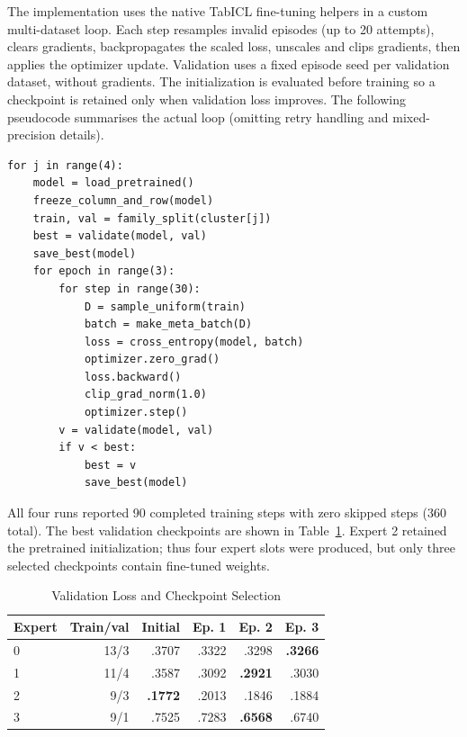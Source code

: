 \documentclass[conference]{IEEEtran}
\begin{document}
The implementation uses the native TabICL fine-tuning helpers in a custom multi-dataset loop. Each step resamples invalid episodes (up to 20 attempts), clears gradients, backpropagates the scaled loss, unscales and clips gradients, then applies the optimizer update. Validation uses a fixed episode seed per validation dataset, without gradients. The initialization is evaluated before training so a checkpoint is retained only when validation loss improves. The following pseudocode summarises the actual loop (omitting retry handling and mixed-precision details).
\begin{lstlisting}[basicstyle=\ttfamily\scriptsize,breaklines=true,frame=single]
for j in range(4):
    model = load_pretrained()
    freeze_column_and_row(model)
    train, val = family_split(cluster[j])
    best = validate(model, val)
    save_best(model)
    for epoch in range(3):
        for step in range(30):
            D = sample_uniform(train)
            batch = make_meta_batch(D)
            loss = cross_entropy(model, batch)
            optimizer.zero_grad()
            loss.backward()
            clip_grad_norm(1.0)
            optimizer.step()
        v = validate(model, val)
        if v < best:
            best = v
            save_best(model)
\end{lstlisting}
All four runs reported 90 completed training steps with zero skipped steps (360 total). The best validation checkpoints are shown in Table~\ref{tab:expertval}. Expert 2 retained the pretrained initialization; thus four expert slots were produced, but only three selected checkpoints contain fine-tuned weights.
\begin{table}[t]
\caption{Validation Loss and Checkpoint Selection}
\label{tab:expertval}
\centering\footnotesize
\begin{tabular}{lrrrrr}\toprule
Expert & Train/val & Initial & Ep. 1 & Ep. 2 & Ep. 3\\\midrule
0 & 13/3 & .3707 & .3322 & .3298 & \textbf{.3266}\\
1 & 11/4 & .3587 & .3092 & \textbf{.2921} & .3030\\
2 & 9/3 & \textbf{.1772} & .2013 & .1846 & .1884\\
3 & 9/1 & .7525 & .7283 & \textbf{.6568} & .6740\\\bottomrule
\end{tabular}
\end{table}
\end{document}
